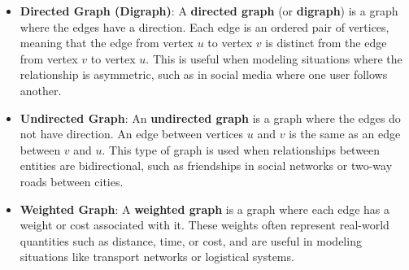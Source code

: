 \documentclass{book}
\begin{document}
\begin{itemize}
    \item \textbf{Directed Graph (Digraph)}: A \textbf{directed graph} (or \textbf{digraph}) is a graph where the edges have a direction. Each edge is an ordered pair of vertices, meaning that the edge from vertex \( u \) to vertex \( v \) is distinct from the edge from vertex \( v \) to vertex \( u \). This is useful when modeling situations where the relationship is asymmetric, such as in social media where one user follows another.
    

    \item \textbf{Undirected Graph}: An \textbf{undirected graph} is a graph where the edges do not have direction. An edge between vertices \( u \) and \( v \) is the same as an edge between \( v \) and \( u \). This type of graph is used when relationships between entities are bidirectional, such as friendships in social networks or two-way roads between cities.
    
    
    \item \textbf{Weighted Graph}: A \textbf{weighted graph} is a graph where each edge has a weight or cost associated with it. These weights often represent real-world quantities such as distance, time, or cost, and are useful in modeling situations like transport networks or logistical systems.
    
    

\end{itemize}
\end{document}
